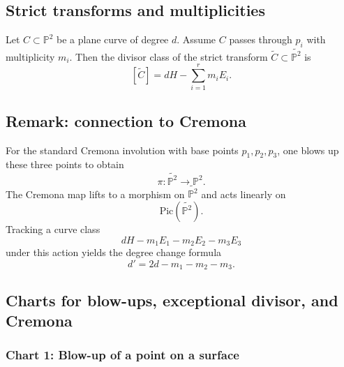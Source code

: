 \documentclass[12pt,a4paper]{article}
\theoremstyle{plain}
\theoremstyle{definition}      %
\begin{document}
\subsection*{Strict transforms and multiplicities}

Let $C\subset \mathbb P^2$ be a plane curve of degree $d$.
Assume $C$ passes through $p_i$ with multiplicity $m_i$.
Then the divisor class of the strict transform $\widetilde C\subset \widetilde{\mathbb P^2}$ is
\[
[\widetilde C]
=
dH-\sum_{i=1}^r m_i E_i.
\]

\subsection*{Remark: connection to Cremona}

For the standard Cremona involution with base points $p_1,p_2,p_3$, one blows up these three points to obtain
\[
\pi:\widetilde{\mathbb P^2}\to \mathbb P^2.
\]
The Cremona map lifts to a morphism on $\widetilde{\mathbb P^2}$ and acts linearly on
\[
\mathrm{Pic}(\widetilde{\mathbb P^2}).
\]
Tracking a curve class
\[
dH-m_1E_1-m_2E_2-m_3E_3
\]
under this action yields the degree change formula
\[
d' = 2d - m_1 - m_2 - m_3.
\]

\clearpage

\subsection*{Charts for blow-ups, exceptional divisor, and Cremona}

\subsubsection*{Chart 1: Blow-up of a point on a surface}
\end{document}
